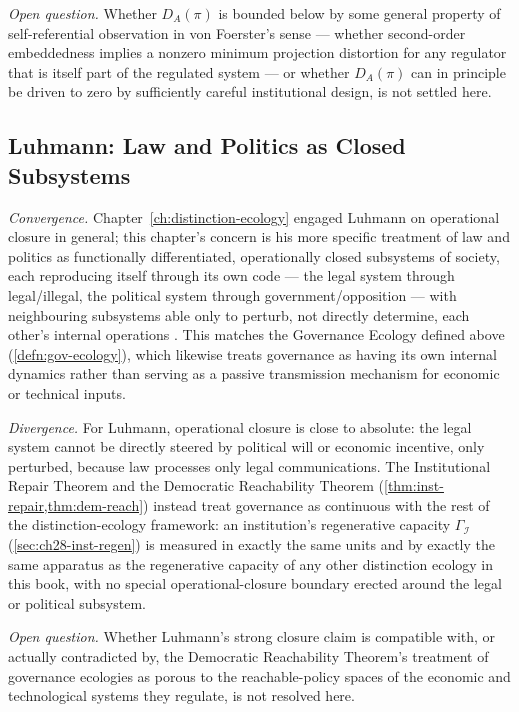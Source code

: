 \documentclass[12pt,twoside,openright]{book}
\begin{document}
\emph{Open question.} Whether $D_A(\pi)$ is bounded below by some
general property of self-referential observation in von
Foerster's sense --- whether second-order embeddedness implies a
nonzero minimum projection distortion for any regulator that is
itself part of the regulated system --- or whether $D_A(\pi)$ can
in principle be driven to zero by sufficiently careful
institutional design, is not settled here.

\subsection*{Luhmann: Law and Politics as Closed Subsystems}

\emph{Convergence.} Chapter~\ref{ch:distinction-ecology} engaged
Luhmann on operational closure in general; this chapter's concern
is his more specific treatment of law and politics as
functionally differentiated, operationally closed subsystems of
society, each reproducing itself through its own code --- the
legal system through legal/illegal, the political system through
government/opposition --- with neighbouring subsystems able only
to perturb, not directly determine, each other's internal
operations \parencite{luhmann1990}. This matches the Governance
Ecology defined above (\cref{defn:gov-ecology}), which likewise
treats governance as having its own internal dynamics rather than
serving as a passive transmission mechanism for economic or
technical inputs.

\emph{Divergence.} For Luhmann, operational closure is close to
absolute: the legal system cannot be directly steered by
political will or economic incentive, only perturbed, because law
processes only legal communications. The Institutional Repair
Theorem and the Democratic Reachability Theorem
(\cref{thm:inst-repair,thm:dem-reach}) instead treat governance as
continuous with the rest of the distinction-ecology framework: an
institution's regenerative capacity $\Gamma_\mathcal{I}$
(\cref{sec:ch28-inst-regen}) is measured in exactly the same units
and by exactly the same apparatus as the regenerative capacity of
any other distinction ecology in this book, with no special
operational-closure boundary erected around the legal or
political subsystem.

\emph{Open question.} Whether Luhmann's strong closure claim is
compatible with, or actually contradicted by, the Democratic
Reachability Theorem's treatment of governance ecologies as
porous to the reachable-policy spaces of the economic and
technological systems they regulate, is not resolved here.
\end{document}
